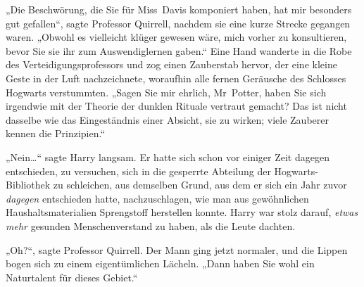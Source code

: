 „Die Beschwörung, die Sie für Miss~Davis komponiert haben, hat mir besonders gut gefallen“, sagte Professor Quirrell, nachdem sie eine kurze Strecke gegangen waren.
„Obwohl es vielleicht klüger gewesen wäre, mich vorher zu konsultieren, bevor Sie sie ihr zum Auswendiglernen gaben.“ Eine Hand wanderte in die Robe des Verteidigungsprofessors und zog einen Zauberstab hervor, der eine kleine Geste in der Luft nachzeichnete, woraufhin alle fernen Geräusche des Schlosses Hogwarts verstummten.
„Sagen Sie mir ehrlich, Mr~Potter, haben Sie sich irgendwie mit der Theorie der dunklen Rituale vertraut gemacht? Das ist nicht dasselbe wie das Eingeständnis einer Absicht, sie zu wirken; viele Zauberer kennen die Prinzipien.“

„Nein…“ sagte Harry langsam. Er hatte sich schon vor einiger Zeit dagegen entschieden, zu versuchen, sich in die gesperrte Abteilung der Hogwarts-Bibliothek zu schleichen, aus demselben Grund, aus dem er sich ein Jahr zuvor \emph{dagegen} entschieden hatte, nachzuschlagen, wie man aus gewöhnlichen Haushaltsmaterialien Sprengstoff herstellen konnte. Harry war stolz darauf, \emph{etwas} \emph{mehr} gesunden Menschenverstand zu haben, als die Leute dachten.

„Oh?“, sagte Professor Quirrell. Der Mann ging jetzt normaler, und die Lippen bogen sich zu einem eigentümlichen Lächeln.
„Dann haben Sie wohl ein Naturtalent für dieses Gebiet.“

